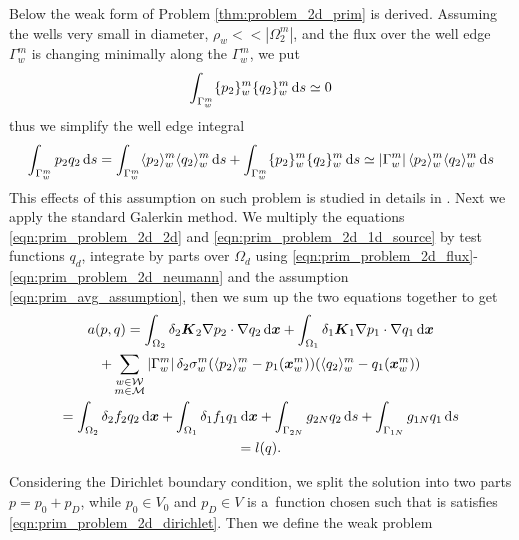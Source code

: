 Below the weak form of Problem \ref{thm:problem_2d_prim} is derived.
Assuming the wells very small in diameter, $\rho_w << |\Omega^m_2|$, and the flux over the well edge $\Gamma^m_w$ is
changing minimally along the $\Gamma^m_w$, we put 
\begin{equation}
    \int_{\Gamma^m_w} \{p_2\}^m_w\{q_2\}^m_w \,{\rm d} s \simeq 0
\end{equation}
thus we simplify the well edge integral
\begin{equation} \label{eqn:prim_avg_assumption}
    \int_{\Gamma^m_w} p_2q_2 \dd s %
    =  \int_{\Gamma^m_w} \avg{p_2}^m_w\avg{q_2}^m_w \dd s + \int_{\Gamma^m_w} \fluct{p_2}^m_w\fluct{q_2}^m_w \dd s \simeq \abs{\Gamma^m_w} \avg{p_2}^m_w\avg{q_2}^m_w \dd s
\end{equation}
This effects of this assumption on such problem is studied in details in \cite{koppl_vidotto_2018}.
%
Next we apply the standard Galerkin method. We multiply the equations \eqref{eqn:prim_problem_2d_2d} and \eqref{eqn:prim_problem_2d_1d_source}
by test functions $q_d$, integrate by parts over $\Omega_d$ using \eqref{eqn:prim_problem_2d_flux}-\eqref{eqn:prim_problem_2d_neumann} and the assumption \eqref{eqn:prim_avg_assumption}, 
then we sum up the two equations together to get
\begin{multline} \label{eqn:prim_weak_form}
  a(p,q) =
  \int_{\Omega_2} \delta_2 \mathbf{\boldsymbol{K}}_2 \nabla p_2 \cdot \nabla q_2 \,{\rm d}\mathbf{\boldsymbol{x}}
  + \int_{\Omega_1} \delta_1 \mathbf{\boldsymbol{K}}_1 \nabla p_1 \cdot \nabla q_1 \,{\rm d}\mathbf{\boldsymbol{x}} \\
  + \sum_{\substack{w\in \mathcal{W} \\ m\in \mathcal{M}}} \left|\Gamma^m_w\right| \delta_2 \sigma^m_w (\langle p_2\rangle^m_w - p_1(\mathbf{\boldsymbol{x}}^m_w)) (\langle q_2\rangle^m_w - q_1(\mathbf{\boldsymbol{x}}^m_w)) \\
  = \int_{\Omega_2} \delta_2 f_2 q_2 \,{\rm d}\mathbf{\boldsymbol{x}} + \int_{\Omega_1} \delta_1 f_1 q_1 \,{\rm d}\mathbf{\boldsymbol{x}}
  + \int_{\Gamma_{2N}} g_{2N}q_2 \,{\rm d} s + \int_{\Gamma_{1N}} g_{1N}q_1 \,{\rm d} s \\
  = l(q).
\end{multline}

Considering the Dirichlet boundary condition, we split the solution into two parts $p=p_0 + p_D$, while
$p_0\in V_0$ and $p_D\in V$ is a~function chosen such that is satisfies \eqref{eqn:prim_problem_2d_dirichlet}.
Then we define the weak problem

